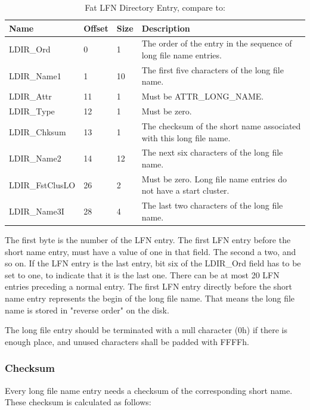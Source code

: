 \begin{table}[!ht]
\caption{Fat LFN Directory Entry, compare to: \cite{usb_ms_jan, fatgen103}}
\centering
\begin{tabular}{|l|l|l|p{9cm}|}
\hline\hline
\textbf{Name} & \textbf{Offset} & \textbf{Size} & \textbf{Description}\\ \hline
LDIR\_Ord & 0 & 1 & The order of the entry in the sequence of long file name entries. \\ \hline
LDIR\_Name1 & 1 & 10 & The first five characters of the long file name. \\ \hline
LDIR\_Attr & 11 & 1 & Must be ATTR\_LONG\_NAME. \\ \hline
LDIR\_Type & 12 & 1 & Must be zero. \\ \hline
LDIR\_Chksum & 13 & 1 & The checksum of the short name associated with this long file name. \\ \hline
LDIR\_Name2& 14 & 12 & The next six characters of the long file name. \\ \hline
LDIR\_FstClusLO & 26 & 2 & Must be zero. Long file name entries do not have a start cluster. \\ \hline
LDIR\_Name3I & 28 & 4 & The last two characters of the long file name. \\ \hline
\end{tabular}
\label{table:fat_lfn_dir_entry}
\end{table}

The first byte is the number of the LFN entry. The first LFN entry before the short name entry, must have a value of one in that field. The second a two, and so on. If the LFN entry is the last entry, bit six of the LDIR\_Ord field has to be set to one, to indicate that it is the last one. There can be at most 20 LFN entries preceding a normal entry. The first LFN entry directly before the short name entry represents the begin of the long file name. That means the long file name is stored in "reverse order" on the disk. 

The long file entry should be terminated with a null character (0h) if there is enough place, and unused characters shall be padded with FFFFh.

\subsubsection{Checksum}

Every long file name entry needs a checksum of the corresponding short name. These checksum is calculated as follows:

